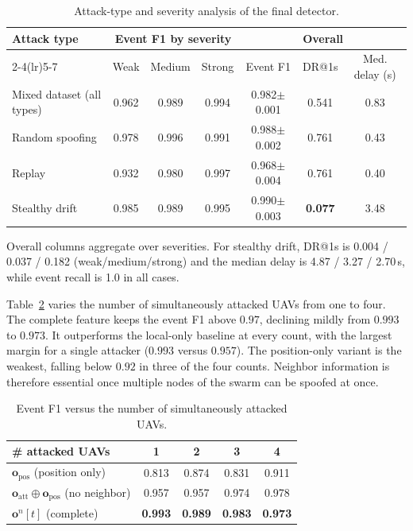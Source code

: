 \begin{table}[htbp]
  \centering
  \caption{Attack-type and severity analysis of the final detector.}
  \label{tab:attack_type_severity}
  \begin{tabular}{lccc ccc}
    \toprule
    \multirow{2}{*}{Attack type} & \multicolumn{3}{c}{Event F1 by severity}
      & \multicolumn{3}{c}{Overall} \\
    \cmidrule(lr){2-4}\cmidrule(lr){5-7}
    & Weak & Medium & Strong & Event F1 & DR@1s & Med. delay (s) \\
    \midrule
    Mixed dataset (all types) & 0.962 & 0.989 & 0.994
      & 0.982$\pm$0.001 & 0.541 & 0.83 \\
    Random spoofing  & 0.978 & 0.996 & 0.991 & 0.988$\pm$0.002 & 0.761 & 0.43 \\
    Replay           & 0.932 & 0.980 & 0.997 & 0.968$\pm$0.004 & 0.761 & 0.40 \\
    Stealthy drift   & 0.985 & 0.989 & 0.995 & 0.990$\pm$0.003 & \textbf{0.077} & 3.48 \\
    \bottomrule
  \end{tabular}
  \smallskip
  \footnotesize{Overall columns aggregate over severities. For stealthy
  drift, DR@1s is 0.004 / 0.037 / 0.182 (weak/medium/strong) and the median
  delay is 4.87 / 3.27 / 2.70\,s, while event recall is 1.0 in all cases.}
\end{table}

Table~\ref{tab:attack_count} varies the number of simultaneously attacked
UAVs from one to four. The complete feature keeps the event F1 above $0.97$,
declining mildly from $0.993$ to $0.973$. It outperforms the local-only
baseline at every count, with the largest margin for a single attacker
($0.993$ versus $0.957$). The position-only variant is the weakest, falling
below $0.92$ in three of the four counts. Neighbor information is therefore
essential once multiple nodes of the swarm can be spoofed at once.

\begin{table}[htbp]
  \centering
  \caption{Event F1 versus the number of simultaneously attacked UAVs.}
  \label{tab:attack_count}
  \begin{tabular}{lcccc}
    \toprule
    \# attacked UAVs & 1 & 2 & 3 & 4 \\
    \midrule
    $\mathbf{o}_{\mathrm{pos}}$ (position only) & 0.813 & 0.874 & 0.831 & 0.911 \\
    $\mathbf{o}_{\mathrm{att}}\oplus\mathbf{o}_{\mathrm{pos}}$ (no neighbor)
      & 0.957 & 0.957 & 0.974 & 0.978 \\
    $\mathbf{o}^n[t]$ (complete) & \textbf{0.993} & \textbf{0.989}
      & \textbf{0.983} & \textbf{0.973} \\
    \bottomrule
  \end{tabular}
\end{table}

